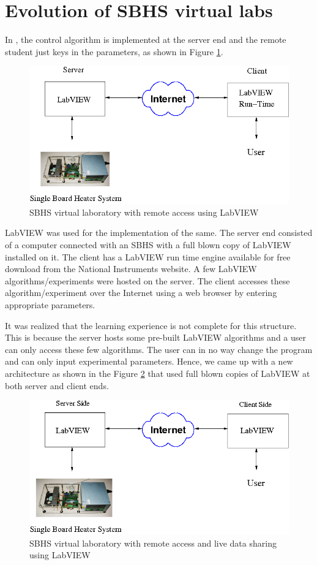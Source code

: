 \section{Evolution of SBHS virtual labs}
In \cite{vlabs-kmm}, 
the control algorithm is implemented at the server end and the remote
student just keys in the parameters, as shown in Figure
\ref{fig:initial}. 
\begin{figure}
\includegraphics[width=\linewidth]{vlabs/vlab-1.png}
\caption{SBHS virtual laboratory with remote access using LabVIEW}
\label{fig:initial}
\end{figure}
LabVIEW was used for the implementation of the same. The
server end consisted of a computer connected with an SBHS with a full
blown copy of LabVIEW installed on it. The client has a LabVIEW run
time engine available for free download from the National Instruments
website.  A few
LabVIEW algorithms/experiments were hosted on the server. The client
accesses these algorithm/experiment over the Internet using a web
browser by entering appropriate parameters.

It was realized that the learning experience is not complete for this
structure. This is because the server hosts some pre-built LabVIEW
algorithms and a user can only access these few algorithms. The user
can in no way change the program and can only input experimental
parameters. 
Hence, we came up with a new architecture
as shown in the Figure \ref{fig:second} that used full blown copies of
LabVIEW at both server and client ends.  
\begin{figure}
\includegraphics[width=\linewidth]{IEEE-Chile/figures/vlab-2.png}
\caption{SBHS virtual laboratory with remote access and live data sharing using LabVIEW}
\label{fig:second}
\end{figure}
 

